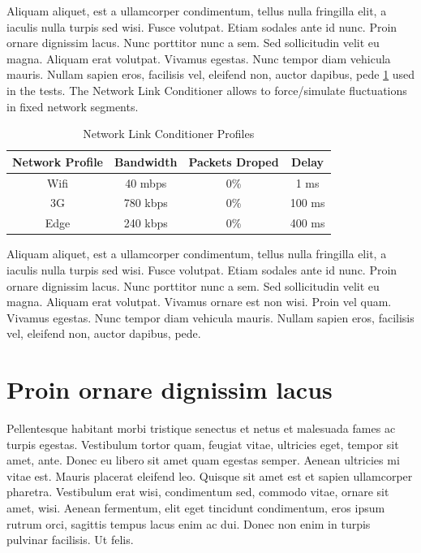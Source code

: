 Aliquam aliquet, est a ullamcorper condimentum, tellus nulla fringilla elit, a iaculis nulla turpis sed wisi. Fusce volutpat. Etiam sodales ante id nunc. Proin ornare dignissim lacus. Nunc porttitor nunc a sem. Sed sollicitudin velit eu magna. Aliquam erat volutpat. Vivamus egestas. Nunc tempor diam vehicula mauris. Nullam sapien eros, facilisis vel, eleifend non, auctor dapibus, pede \ref{tab:network_profiles} used in the tests. The Network Link Conditioner allows to force/simulate fluctuations in fixed network segments.

\begin{table}[htb]
\centering
\normalsize
    \caption{Network Link Conditioner Profiles}
    \label{tab:network_profiles}
{\footnotesize
    \begin{tabular}{ | c | c | c | c | }
    \hline 
    \textbf{Network Profile}	& \textbf{Bandwidth} & \textbf{Packets Droped} & \textbf{Delay}\\ \hline \hline
    Wifi  & 40 mbps  &  0\%  &   1 ms \\ \hline
    3G  & 780 kbps  &  0\%  &   100 ms \\ \hline 
    Edge  & 240 kbps  &  0\%  &   400 ms \\ \hline
    \end{tabular}
    }
\end{table}

Aliquam aliquet, est a ullamcorper condimentum, tellus nulla fringilla elit, a iaculis nulla turpis sed wisi. Fusce volutpat. Etiam sodales ante id nunc. Proin ornare dignissim lacus. Nunc porttitor nunc a sem. Sed sollicitudin velit eu magna. Aliquam erat volutpat. Vivamus ornare est non wisi. Proin vel quam. Vivamus egestas. Nunc tempor diam vehicula mauris. Nullam sapien eros, facilisis vel, eleifend non, auctor dapibus, pede.
\section{Proin ornare dignissim lacus}
Pellentesque habitant morbi tristique senectus et netus et malesuada fames ac turpis egestas. Vestibulum tortor quam, feugiat vitae, ultricies eget, tempor sit amet, ante. Donec eu libero sit amet quam egestas semper. Aenean ultricies mi vitae est. Mauris placerat eleifend leo. Quisque sit amet est et sapien ullamcorper pharetra. Vestibulum erat wisi, condimentum sed, commodo vitae, ornare sit amet, wisi. Aenean fermentum, elit eget tincidunt condimentum, eros ipsum rutrum orci, sagittis tempus lacus enim ac dui. Donec non enim in turpis pulvinar facilisis. Ut felis.

